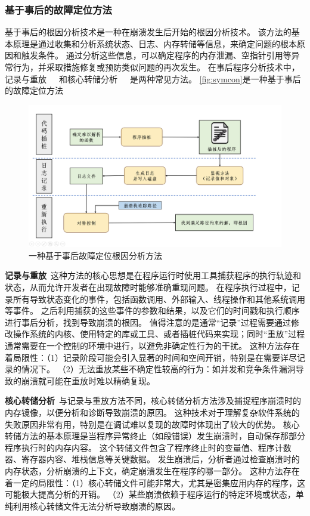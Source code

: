 \subsubsection{基于事后的故障定位方法}
基于事后的根因分析技术是一种在崩溃发生后开始的根因分析技术。
该方法的基本原理是通过收集和分析系统状态、日志、内存转储等信息，来确定问题的根本原因和触发条件。
通过分析这些信息，可以确定程序的内存泄漏、空指针引用等异常行为，并采取措施修复或预防类似问题的再次发生。
在事后程序分析技术中，记录与重放~\cite{ReCrash2008}~\cite{SymCrash2014}~\cite{Chronicler2013}和核心转储分析~\cite{RETracer2016}~\cite{Making2015}~\cite{CREDAL2016}是两种常见方法。
\autoref{fig:symcon}是一种基于事后的故障定位方法~\cite{SymCrash2014}
\begin{figure}[h]
    \centering
    \includegraphics[width=1.0\textwidth]{./figure/Symcon.png}
    \caption{一种基于事后故障定位根因分析方法}
    \label{fig:symcon}
\end{figure}


\textbf{记录与重放}\ 这种方法的核心思想是在程序运行时使用工具捕获程序的执行轨迹和状态，从而允许开发者在出现故障时能够准确重现问题。
在程序执行过程中，记录所有导致状态变化的事件，包括函数调用、外部输入、线程操作和其他系统调用等事件。
之后利用捕获的这些事件的参数和结果，以及它们的时间戳和执行顺序进行事后分析，找到导致崩溃的根因。
值得注意的是通常“记录”过程需要通过修改操作系统的内核、使用特定的库或工具、或者插桩代码来实现；同时“重放”过程通常需要在一个控制的环境中进行，以避免非确定性行为的干扰。
这种方法存在着局限性：（1）记录阶段可能会引入显著的时间和空间开销，特别是在需要详尽记录的情况下。
（2）无法重放某些不确定性较高的行为：如并发和竞争条件漏洞导致的崩溃就可能在重放时难以精确复现。

\textbf{核心转储分析}\ 与记录与重放方法不同，核心转储分析方法涉及捕捉程序崩溃时的内存镜像，以便分析和诊断导致崩溃的原因。
这种技术对于理解复杂软件系统的失败原因非常有用，特别是在调试难以复现的故障时体现出了较大的优势。
核心转储方法的基本原理是当程序异常终止（如段错误）发生崩溃时，自动保存那部分程序执行时的内存内容。
这个转储文件包含了程序终止时的变量值、程序计数器、寄存器内容、堆栈信息等关键数据。
发生崩溃后，分析者通过检查崩溃时的内存状态，分析崩溃的上下文，确定崩溃发生在程序的哪一部分。
这种方法存在着一定的局限性：（1）核心转储文件可能非常大，尤其是密集应用内存的程序，这可能极大提高分析的开销。
（2）某些崩溃依赖于程序运行的特定环境或状态，单纯利用核心转储文件无法分析导致崩溃的原因。


